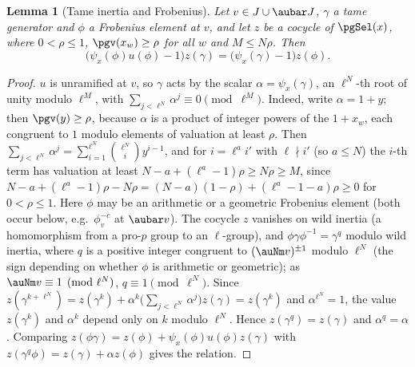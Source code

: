 \documentclass[10pt]{amsart}
\newtheorem{lemma}[theorem]{Lemma}
\theoremstyle{definition}
\theoremstyle{remark}
\begin{document}
\begin{lemma}[Tame inertia and Frobenius]\label{pg:tame}
Let $v\in J\cup\aubar J$, $\gamma$ a tame generator and $\phi$ a Frobenius element at $v$, and let
$z$ be a cocycle of $\pgSel(x)$, where $0<\rho\le1$, $\pgv(x_w)\ge\rho$ for all $w$ and $M\le N\rho$. Then
\[
\bigl(\psi_x(\phi)u(\phi)-1\bigr)z(\gamma)=\bigl(\psi_x(\gamma)-1\bigr)z(\phi).
\]
\end{lemma}
\begin{proof}
$u$ is unramified at $v$, so $\gamma$ acts by the scalar $\alpha=\psi_x(\gamma)$, an $\ell^N$-th
root of unity modulo $\ell^M$, with $\sum_{j<\ell^N}\alpha^j\equiv0\pmod{\ell^M}$. Indeed, write
$\alpha=1+y$; then $\pgv(y)\ge\rho$, because $\alpha$ is a product of integer powers of the
$1+x_w$, each congruent to $1$ modulo elements of valuation at least $\rho$. Then
$\sum_{j<\ell^N}\alpha^j=\sum_{i=1}^{\ell^N}\binom{\ell^N}{i}y^{i-1}$, and for $i=\ell^ai'$ with
$\ell\nmid i'$ (so $a\le N$) the $i$-th term has valuation at least
$N-a+(\ell^a-1)\rho\ge N\rho\ge M$, since $N-a+(\ell^a-1)\rho-N\rho=(N-a)(1-\rho)+(\ell^a-1-a)\rho\ge0$
for $0<\rho\le1$. Here $\phi$ may be an arithmetic or a geometric Frobenius element (both
occur below, e.g.\ $\phi_v^{-c}$ at $\aubar v$). The cocycle $z$ vanishes on wild inertia (a homomorphism from a pro-$p$ group to an
$\ell$-group), and $\phi\gamma\phi^{-1}=\gamma^{q}$ modulo wild inertia, where $q$ is a positive integer
congruent to $(\auNm v)^{\pm1}$ modulo $\ell^N$ (the sign depending on whether $\phi$ is
arithmetic or geometric); as $\auNm v\equiv1\pmod{\ell^N}$, $q\equiv1\pmod{\ell^N}$. Since
$z(\gamma^{k+\ell^N})=z(\gamma^k)+\alpha^k\bigl(\sum_{j<\ell^N}\alpha^j\bigr)z(\gamma)=z(\gamma^k)$
and $\alpha^{\ell^N}=1$, the value $z(\gamma^k)$ and $\alpha^k$ depend only on $k$ modulo
$\ell^N$. Hence $z(\gamma^q)=z(\gamma)$ and $\alpha^q=\alpha$. Comparing $z(\phi\gamma)=z(\phi)+\psi_x(\phi)u(\phi)z(\gamma)$ with
$z(\gamma^q\phi)=z(\gamma)+\alpha z(\phi)$ gives the relation.
\end{proof}
\end{document}
